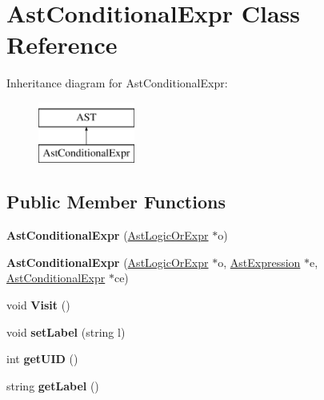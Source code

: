\hypertarget{classAstConditionalExpr}{\section{Ast\-Conditional\-Expr Class Reference}
\label{classAstConditionalExpr}
}
Inheritance diagram for Ast\-Conditional\-Expr\-:\begin{figure}[H]
\begin{center}
\leavevmode
\includegraphics[height=2.000000cm]{classAstConditionalExpr}
\end{center}
\end{figure}
\subsection*{Public Member Functions}
\begin{DoxyCompactItemize}
\item 
\hypertarget{classAstConditionalExpr_a4adcfd01b6eb5f4fb693e085a27953ee}{{\bfseries Ast\-Conditional\-Expr} (\hyperlink{classAstLogicOrExpr}{Ast\-Logic\-Or\-Expr} $\ast$o)}\label{classAstConditionalExpr_a4adcfd01b6eb5f4fb693e085a27953ee}

\item 
\hypertarget{classAstConditionalExpr_aa65a02af9e4ccd958607efcdabdc195f}{{\bfseries Ast\-Conditional\-Expr} (\hyperlink{classAstLogicOrExpr}{Ast\-Logic\-Or\-Expr} $\ast$o, \hyperlink{classAstExpression}{Ast\-Expression} $\ast$e, \hyperlink{classAstConditionalExpr}{Ast\-Conditional\-Expr} $\ast$ce)}\label{classAstConditionalExpr_aa65a02af9e4ccd958607efcdabdc195f}

\item 
\hypertarget{classAstConditionalExpr_af62c2b118fd6064ec838435ffa72f48c}{void {\bfseries Visit} ()}\label{classAstConditionalExpr_af62c2b118fd6064ec838435ffa72f48c}

\item 
\hypertarget{classAST_a71d680856e95ff89f55d5311a552eba6}{void {\bfseries set\-Label} (string l)}\label{classAST_a71d680856e95ff89f55d5311a552eba6}

\item 
\hypertarget{classAST_ab7a5b1d9f1c2de0d98deb356f724a42c}{int {\bfseries get\-U\-I\-D} ()}\label{classAST_ab7a5b1d9f1c2de0d98deb356f724a42c}

\item 
\hypertarget{classAST_aee029be902fffc927d16ccb03eb922ad}{string {\bfseries get\-Label} ()}\label{classAST_aee029be902fffc927d16ccb03eb922ad}

\end{DoxyCompactItemize}
